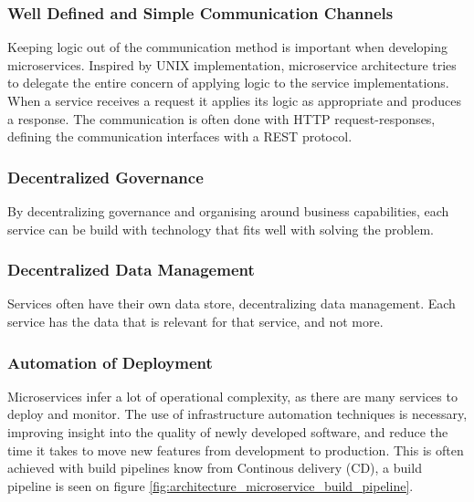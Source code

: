\subsubsection*{Well Defined and Simple Communication Channels}
Keeping logic out of the communication method is important when developing microservices. Inspired by UNIX implementation, microservice architecture tries to delegate the entire concern of applying logic to the service implementations. When a service receives a request it applies its logic as appropriate and produces a response. The communication is often done with HTTP request-responses, defining the communication interfaces with a REST protocol\cite{fowler2014microservices}.

\subsubsection*{Decentralized Governance}
By decentralizing governance and organising around business capabilities, each service can be build with technology that fits well with solving the problem.

\subsubsection*{Decentralized Data Management}
Services often have their own data store, decentralizing data management. Each service has the data that is relevant for that service, and not more. 


\subsubsection*{Automation of Deployment}
Microservices infer a lot of operational complexity, as there are many services to deploy and monitor. The use of infrastructure automation techniques is necessary, improving insight into the quality of newly developed software, and reduce the time it takes to move new features from development to production\cite{newman2015microservices}. This is often achieved with build pipelines know from Continous delivery (CD), a build pipeline is seen on figure \ref{fig:architecture_microservice_build_pipeline}.

